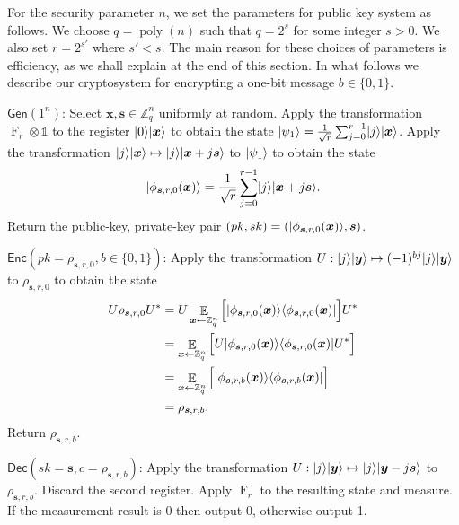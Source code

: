 \documentclass[11pt]{article}
\theoremstyle{plain}
\theoremstyle{definition}
\DeclareMathOperator{\poly}{poly}
\DeclareMathOperator{\qft}{F}
\DeclareMathOperator{\E}{\mathbb{E}}
\DeclarePairedDelimiter{\ket}{\lvert}{\rangle}
\DeclarePairedDelimiter{\bra}{\langle}{\rvert}
\def\Z{\ensuremath{\mathbb{Z}}}
\def\gen{\ensuremath{\mathsf{Gen}}}
\def\enc{\ensuremath{\mathsf{Enc}}}
\def\dec{\ensuremath{\mathsf{Dec}}}
\begin{document}
For the security parameter $n$, we set the parameters for public key system as follows. We choose $q = \poly(n)$ such that $q = 2^s$ for some integer $s > 0$. We also set $r = 2^{s'}$ where $s' < s$. The main reason for these choices of parameters is efficiency, as we shall explain at the end of this section. In what follows we describe our cryptosystem for encrypting a one-bit message $b \in \{ 0, 1 \}$.

\vspace*{\topskip}

$\gen(1^n)$: Select $\bm{x}, \bm{s} \in \Z_q^n$ uniformly at random. Apply the transformation $\qft_r \otimes \mathds{1}$ to the register $\ket{0} \ket{\bm{x}}$ to obtain the state $\ket{\psi_1} = \frac{1}{\sqrt{r}} \sum_{j = 0}^{r - 1} \ket{j} \ket{\bm{x}}$. Apply the transformation $\ket{j}\ket{\bm{x}} \mapsto \ket{j}\ket{\bm{x} + j\bm{s}}$ to $\ket{\psi_1}$ to obtain the state
\[ \ket{\phi_{\bm{s}, r, 0}(\bm{x})} = \frac{1}{\sqrt{r}} \sum_{j = 0}^{r - 1} \ket{j} \ket{\bm{x} + j\bm{s}}. \]
Return the public-key, private-key pair $(pk, sk) = (\ket{\phi_{\bm{s}, r, 0}(\bm{x})}, \bm{s})$.     

\vspace*{\topskip}

$\enc(pk = \rho_{\bm{s}, r, 0}, b \in \{ 0, 1 \})$:  Apply the transformation $U: \ket{j}\ket{\bm{y}} \mapsto (-1)^{bj}\ket{j}\ket{\bm{y}}$ to $\rho_{\bm{s}, r, 0}$ to obtain the state
\begin{align*}
    U \rho_{\bm{s}, r, 0} U^*
    & = U \E_{\bm{x} \leftarrow \Z_q^n} \Big[ \ket{\phi_{\bm{s}, r, 0}(\bm{x})} \bra{\phi_{\bm{s}, r, 0}(\bm{x})} \Big] U^* \\
    & = \E_{\bm{x} \leftarrow \Z_q^n} \Big[ U \ket{\phi_{\bm{s}, r, 0}(\bm{x})} \bra{\phi_{\bm{s}, r, 0}(\bm{x})} U^* \Big] \\
    & = \E_{\bm{x} \leftarrow \Z_q^n} \Big[ \ket{\phi_{\bm{s}, r, b}(\bm{x})} \bra{\phi_{\bm{s}, r, b}(\bm{x})} \Big] \\
    & = \rho_{\bm{s}, r, b}.
\end{align*}
Return $\rho_{\bm{s}, r, b}$.

\vspace*{\topskip}

$\dec(sk = \bm{s}, c = \rho_{\bm{s}, r, b})$:  Apply the transformation $U: \ket{j}\ket{\bm{y}} \mapsto \ket{j}\ket{\bm{y} - j\bm{s}}$ to $\rho_{\bm{s}, r, b}$. Discard the second register. Apply $\qft_r$ to the resulting state and measure. If the measurement result is 0 then output 0, otherwise output 1.
\end{document}

